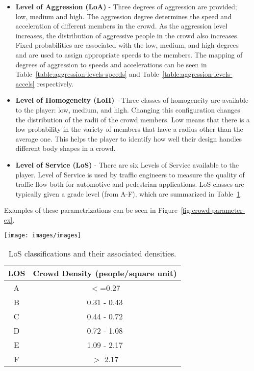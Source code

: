 \begin{itemize}

\item \textbf{Level of Aggression (LoA)} - Three degrees of aggression are provided; low, medium and high. The aggression degree determines the speed and acceleration of different members in the crowd. As the aggression level increases, the distribution of aggressive people in the crowd also increases. Fixed probabilities are associated with the low, medium, and high degrees and are used to assign appropriate speeds to the members. The mapping of degrees of aggression to speeds and accelerations can be seen in Table~\ref{table:aggression-levels-speeds} and Table~\ref{table:aggression-levels-accels} respectively.

\item \textbf{Level of Homogeneity (LoH)} - Three classes of homogeneity are available to the player: low, medium, and high. Changing this configuration changes the distribution of the radii of the crowd members.  Low means that there is a low probability in the variety of members that have a radius other than the average one. This helps the player to identify how well their design handles different body shapes in a crowd.

\item \textbf{Level of Service (LoS)} - There are six Levels of Service available to the player. Level of Service is used by traffic engineers to measure the quality of traffic flow both for automotive and pedestrian applications. LoS classes are typically given a grade level (from A-F), which are summarized in Table~\ref{table:los}. 

\end{itemize}

Examples of these parametrizations can be seen in Figure~\ref{fig:crowd-parameter-ex}.

\begin{figure*}  
	\texttt{[image: images/images]}
	\caption{\label{fig:crowd-parameter-ex}Crowd configuration and simulation: a) High Level of service, b)Low level of service, c)Level of Homogeneity and aggression}
\end{figure*}

\begin{table}
	\centering
	\begin{tabular}{||c c ||}
		\hline
		LOS & Crowd Density (people/square unit)\\ [0.5ex] 
		\hline\hline
		A & $<$=0.27  \\ 
		\hline
		B & 0.31 - 0.43 \\
		\hline
		C & 0.44 - 0.72  \\
		\hline
		D & 0.72 - 1.08 \\
		\hline
		E & 1.09 - 2.17 \\
		\hline
		F & $>$ 2.17 \\ 
		\hline
	\end{tabular}
	\caption{LoS classifications and their associated densities.}
	\label{table:los}
\end{table}

